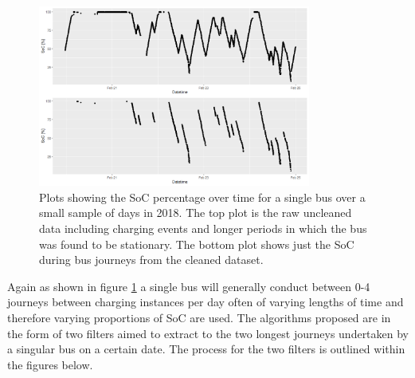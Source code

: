 \documentclass{article}
\begin{document}

\begin{figure}[ht]
    \centering
    \includegraphics[width = 0.8\textwidth]{Raw_and_unflitered_SoC_EMC_3_2018.png}
    \caption{Plots showing the SoC percentage over time for a single bus over a small sample of days in 2018. The top plot is the raw uncleaned data including charging events and longer periods in which the bus was found to be stationary. The bottom plot shows just the SoC during bus journeys from the cleaned dataset.}
    \label{fig:2}
\end{figure}


Again as shown in figure \ref{fig:2} a single bus will generally conduct between 0-4 journeys between charging instances per day often of varying lengths of time and therefore varying proportions of SoC are used. The algorithms proposed are in the form of two filters aimed to extract to the two longest journeys undertaken by a singular bus on a certain date. The process for the two filters is outlined within the figures below.
\end{document}
